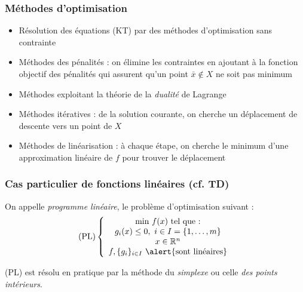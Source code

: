 \documentclass{beamer}
\newcommand{\R}{{\ensuremath\mathbb{R}}}
\begin{document}
\begin{frame}
  \frametitle{Méthodes d'optimisation}

  \begin{itemize}
  \item Résolution des équations (KT) par des méthodes d'optimisation sans contrainte
  \item Méthodes des pénalités : on élimine les contraintes en ajoutant à la fonction objectif des pénalités qui assurent
    qu'un point $\bar{x} \notin X$ ne soit pas minimum   
  \item Méthodes exploitant la théorie de la \emph{dualité} de Lagrange
  \item Méthodes itératives : de la solution courante, on cherche un déplacement de descente vers un point de $X$
  \item Méthodes de linéarisation : à chaque étape, on cherche le minimum d'une approximation linéaire de $f$ pour trouver le
    déplacement 
  \end{itemize}
  
\end{frame}

\begin{frame}
  \frametitle{Cas particulier de fonctions linéaires (cf. TD)}

  On appelle \emph{programme linéaire}, le problème d'optimisation
  suivant : 
  \[
  \text{(PL)} \left\{
  \begin{array}{c}
    \text{min} \ f(x) \ \text{tel que :} \\
    g_i(x) \leq 0, \ i \in I = \{1, \dots, m\} \\
    x \in \R^n \\
    f, \{g_i\}_{i \in I} \ \alert{\text{sont linéaires}} \\
  \end{array}
  \right.
  \]

  (PL) est résolu en pratique par la méthode du \emph{simplexe}
  ou celle \emph{des points intérieurs}.
  
\end{frame}
\end{document}

